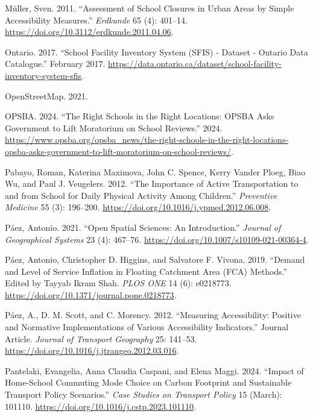 \documentclass[
default
]{sn-jnl}
\newlength{\cslhangindent}
\newenvironment{CSLReferences}[2] %
 {\begin{list}{}{%
  \setlength{\itemindent}{0pt}
  \setlength{\leftmargin}{0pt}
  \setlength{\parsep}{0pt}
  \ifodd #1
   \setlength{\leftmargin}{\cslhangindent}
   \setlength{\itemindent}{-1\cslhangindent}
  \fi
  \setlength{\itemsep}{#2\baselineskip}}}
 {\end{list}}
\begin{document}
\begin{CSLReferences}{1}{0}
Müller, Sven. 2011. {``Assessment of School Closures in Urban Areas by
Simple Accessibility Measures.''} \emph{Erdkunde} 65 (4): 401--14.
\url{https://doi.org/10.3112/erdkunde.2011.04.06}.

Ontario. 2017. {``School Facility Inventory System ({SFIS}) - Dataset -
Ontario Data Catalogue.''} February 2017.
\url{https://data.ontario.ca/dataset/school-facility-inventory-system-sfis}.

OpenStreetMap. 2021.

OPSBA. 2024. {``The Right Schools in the Right Locations: {OPSBA} Asks
Government to Lift Moratorium on School Reviews.''} 2024.
\url{https://www.opsba.org/opsba_news/the-right-schools-in-the-right-locations-opsba-asks-government-to-lift-moratorium-on-school-reviews/}.

Pabayo, Roman, Katerina Maximova, John C. Spence, Kerry Vander Ploeg,
Biao Wu, and Paul J. Veugelers. 2012. {``The Importance of Active
Transportation to and from School for Daily Physical Activity Among
Children.''} \emph{Preventive Medicine} 55 (3): 196--200.
\url{https://doi.org/10.1016/j.ypmed.2012.06.008}.

Páez, Antonio. 2021. {``Open Spatial Sciences: An Introduction.''}
\emph{Journal of Geographical Systems} 23 (4): 467--76.
\url{https://doi.org/10.1007/s10109-021-00364-4}.

Páez, Antonio, Christopher D. Higgins, and Salvatore F. Vivona. 2019.
{``Demand and Level of Service Inflation in Floating Catchment Area
(FCA) Methods.''} Edited by Tayyab Ikram Shah. \emph{PLOS ONE} 14 (6):
e0218773. \url{https://doi.org/10.1371/journal.pone.0218773}.

Páez, A., D. M. Scott, and C. Morency. 2012. {``Measuring Accessibility:
Positive and Normative Implementations of Various Accessibility
Indicators.''} Journal Article. \emph{Journal of Transport Geography}
25: 141--53. \url{https://doi.org/10.1016/j.jtrangeo.2012.03.016}.

Pantelaki, Evangelia, Anna Claudia Caspani, and Elena Maggi. 2024.
{``Impact of Home-School Commuting Mode Choice on Carbon Footprint and
Sustainable Transport Policy Scenarios.''} \emph{Case Studies on
Transport Policy} 15 (March): 101110.
\url{https://doi.org/10.1016/j.cstp.2023.101110}.


\end{CSLReferences}
\end{document}
